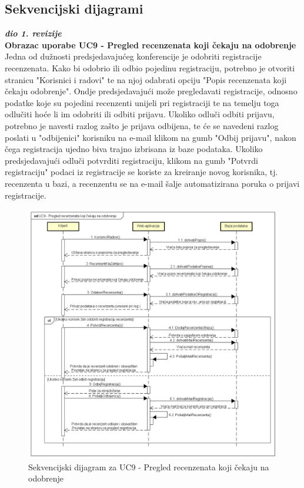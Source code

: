				\eject		
	
				
			\subsection{Sekvencijski dijagrami}
				
				\textbf{\textit{dio 1. revizije}}\\

				\textbf{Obrazac uporabe UC9 - Pregled recenzenata koji čekaju na odobrenje}\\
				Jedna od dužnosti predsjedavajućeg konferencije je odobriti registracije recenzenata. Kako bi odobrio ili odbio pojedinu registraciju, potrebno je otvoriti stranicu "Korisnici i radovi" te na njoj odabrati opciju "Popis recenzenata koji čekaju odobrenje". Ondje predsjedavajući može pregledavati registracije, odnosno podatke koje su pojedini recenzenti unijeli pri registraciji te na temelju toga odlučiti hoće li im odobriti ili odbiti prijavu. Ukoliko odluči odbiti prijavu, potrebno je navesti razlog zašto je prijava odbijena, te će se navedeni razlog poslati u "odbijenici" korisniku na e-mail klikom na gumb "Odbij prijavu", nakon čega registracija ujedno biva trajno izbrisana iz baze podataka. Ukoliko predsjedavajući odluči potvrditi registraciju, klikom na gumb "Potvrdi registraciju" podaci iz registracije se koriste za kreiranje novog korisnika, tj. recenzenta u bazi, a recenzentu se na e-mail šalje automatizirana poruka o prijavi registracije.
				\eject

				\begin{figure}[H]
					\includegraphics[scale=0.50]{dijagrami/UC9-RegistrRecenzent.png} 
					\centering
					\caption{Sekvencijski dijagram za UC9 - Pregled recenzenata koji čekaju na odobrenje}
					\label{fig:sekvencijski1}
				\end{figure}


